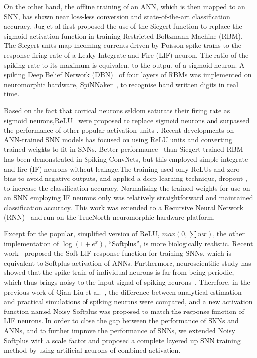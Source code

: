 \documentclass{article}
\begin{document}
On the  other  hand, the offline training of an ANN, which is then mapped to an SNN, has shown near loss-less conversion and state-of-the-art classification accuracy.
Jug et al\cite{Jug_etal_2012} first proposed the use of the Siegert function to replace the sigmoid activation function in training Restricted Boltzmann Machine (RBM).
The Siegert units map incoming currents driven by Poisson spike trains to the response firing rate of a Leaky Integrate-and-Fire (LIF) neuron.
The ratio of the spiking rate to its maximum is equivalent to the output of a sigmoid neuron.
A spiking Deep Belief Network (DBN)~\cite{Stromatias2015scalable} of four layers of RBMs was implemented on neuromorphic hardware, SpiNNaker~\cite{furber2014spinnaker}, to recognise hand written digits in real time.

Based on the fact that cortical neurons seldom saturate their firing rate as sigmoid neurons,ReLU~\cite{glorot2011deep} were proposed to replace sigmoid neurons and surpassed the performance of other popular activation units 
.
Recent developments on ANN-trained SNN models has focused on using ReLU units and converting trained weights to fit in SNNs.
Better performance~\cite{cao2015spiking,diehl2015fast} than Siegert-trained RBM has been demonstrated in Spiking ConvNets, but this employed simple integrate and fire (IF) neurons without leakage.The training used only ReLUs and zero bias to avoid negative outputs, and applied a deep learning technique, dropout\cite{srivastava2014dropout} , to increase the classification accuracy.
Normalising the trained weights for use on an SNN employing IF neurons only was relatively straightforward and maintained classification accuracy.
This work was extended to a Recursive Neural Network (RNN)~\cite{diehl2016conversion} and run on the TrueNorth\cite{merolla2014million} neuromorphic hardware platform.

Except for the popular, simplified version of ReLU, $max(0,\sum w x)$, the other implementation of $\log(1+e^x)$, ``Softplus'', is more biologically realistic.
Recent work~\cite{hunsberger2015spiking} proposed the Soft LIF response function for training SNNs, which is equivalent to Softplus activation of ANNs. Furthermore, neuroscientific study has showed that the spike train of individual neurons is far from being periodic, which thus brings noisy to the input signal of spiking neurons~\cite{Gerstner:2002}. Therefore, in the previous work of Qian Liu et al.~\cite{Noisysoftplus}, the difference between analytical estimation and practical simulations of spiking neurons were compared, and a new activation function named Noisy Softplus was proposed to match the response function of LIF neurons. In order to close the gap between the performance of SNNs and ANNs, and to further improve the performance of SNNs, we extended Noisy Softplus with a scale factor and proposed a complete layered up SNN training method by using artificial neurons of combined activation.
\end{document}
